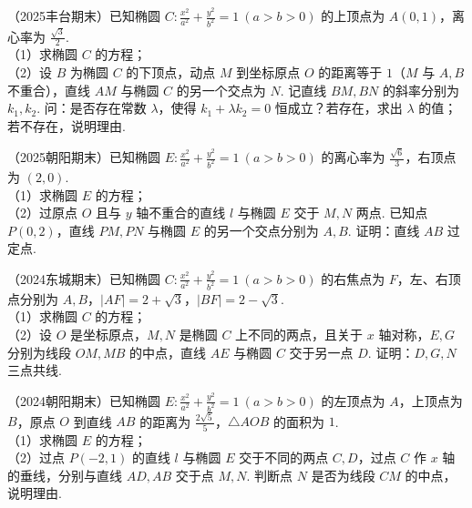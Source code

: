 \begin{example} %
（2025丰台期末）已知椭圆 $C:\frac{x^2}{a^2}+\frac{y^2}{b^2}=1\ (a>b>0)$ 的上顶点为 $A(0,1)$，离心率为 $\frac{\sqrt{3}}{2}$.\\
（1）求椭圆 $C$ 的方程；\\
（2）设 $B$ 为椭圆 $C$ 的下顶点，动点 $M$ 到坐标原点 $O$ 的距离等于 $1$（$M$ 与 $A,B$ 不重合），直线 $AM$ 与椭圆 $C$ 的另一个交点为 $N$. 记直线 $BM,BN$ 的斜率分别为 $k_1,k_2$. 问：是否存在常数 $\lambda$，使得 $k_1+\lambda k_2=0$ 恒成立？若存在，求出 $\lambda$ 的值；若不存在，说明理由.
\end{example}

\begin{example} %
（2025朝阳期末）已知椭圆 $E:\frac{x^2}{a^2}+\frac{y^2}{b^2}=1\ (a>b>0)$ 的离心率为 $\frac{\sqrt{6}}{3}$，右顶点为 $(2,0)$.\\
（1）求椭圆 $E$ 的方程；\\
（2）过原点 $O$ 且与 $y$ 轴不重合的直线 $l$ 与椭圆 $E$ 交于 $M,N$ 两点. 已知点 $P(0,2)$，直线 $PM,PN$ 与椭圆 $E$ 的另一个交点分别为 $A,B$. 证明：直线 $AB$ 过定点.
\end{example}

\begin{example} %
（2024东城期末）已知椭圆 $C:\frac{x^2}{a^2}+\frac{y^2}{b^2}=1\ (a>b>0)$ 的右焦点为 $F$，左、右顶点分别为 $A,B$，$\lvert AF\rvert=2+\sqrt{3}$，$\lvert BF\rvert=2-\sqrt{3}$.\\
（1）求椭圆 $C$ 的方程；\\
（2）设 $O$ 是坐标原点，$M,N$ 是椭圆 $C$ 上不同的两点，且关于 $x$ 轴对称，$E,G$ 分别为线段 $OM,MB$ 的中点，直线 $AE$ 与椭圆 $C$ 交于另一点 $D$. 证明：$D,G,N$ 三点共线.
\end{example}

\begin{example} %
（2024朝阳期末）已知椭圆 $E:\frac{x^2}{a^2}+\frac{y^2}{b^2}=1\ (a>b>0)$ 的左顶点为 $A$，上顶点为 $B$，原点 $O$ 到直线 $AB$ 的距离为 $\frac{2\sqrt{5}}{5}$，$\triangle AOB$ 的面积为 $1$.\\
（1）求椭圆 $E$ 的方程；\\
（2）过点 $P(-2,1)$ 的直线 $l$ 与椭圆 $E$ 交于不同的两点 $C,D$，过点 $C$ 作 $x$ 轴的垂线，分别与直线 $AD,AB$ 交于点 $M,N$. 判断点 $N$ 是否为线段 $CM$ 的中点，说明理由.
\end{example}

